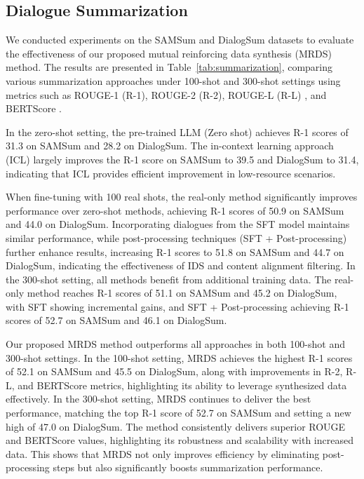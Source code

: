 \subsection{Dialogue Summarization}
We conducted experiments on the SAMSum and DialogSum datasets to evaluate the effectiveness of our proposed mutual reinforcing data synthesis (MRDS) method. The results are presented in Table~\ref{tab:summarization}, comparing various summarization approaches under 100-shot and 300-shot settings using metrics such as ROUGE-1 (R-1), ROUGE-2 (R-2), ROUGE-L (R-L) \citep{lin-2004-rouge}, and BERTScore \citep{bert-score}.

In the zero-shot setting, the pre-trained LLM (Zero shot) achieves R-1 scores of 31.3 on SAMSum and 28.2 on DialogSum. The in-context learning approach (ICL) largely improves the R-1 score on SAMSum to 39.5 and DialogSum to 31.4, indicating that ICL provides efficient improvement in low-resource scenarios.

When fine-tuning with 100 real shots, the real-only method significantly improves performance over zero-shot methods, achieving R-1 scores of 50.9 on SAMSum and 44.0 on DialogSum. 
Incorporating dialogues from the SFT model maintains similar performance, while post-processing techniques (SFT + Post-processing) further enhance results, increasing R-1 scores to 51.8 on SAMSum and 44.7 on DialogSum, indicating the effectiveness of IDS and content alignment filtering. 
In the 300-shot setting, all methods benefit from additional training data. 
The real-only method reaches R-1 scores of 51.1 on SAMSum and 45.2 on DialogSum, with {SFT} showing incremental gains, and {SFT + Post-processing} achieving R-1 scores of 52.7 on SAMSum and 46.1 on DialogSum.

Our proposed MRDS method outperforms all approaches in both 100-shot and 300-shot settings. 
In the 100-shot setting, MRDS achieves the highest R-1 scores of 52.1 on SAMSum and 45.5 on DialogSum, along with improvements in R-2, R-L, and BERTScore metrics, highlighting its ability to leverage synthesized data effectively. 
In the 300-shot setting, MRDS continues to deliver the best performance, matching the top R-1 score of 52.7 on SAMSum and setting a new high of 47.0 on DialogSum. 
The method consistently delivers superior ROUGE and BERTScore values, highlighting its robustness and scalability with increased data. This shows that MRDS not only improves efficiency by eliminating post-processing steps but also significantly boosts summarization performance.


